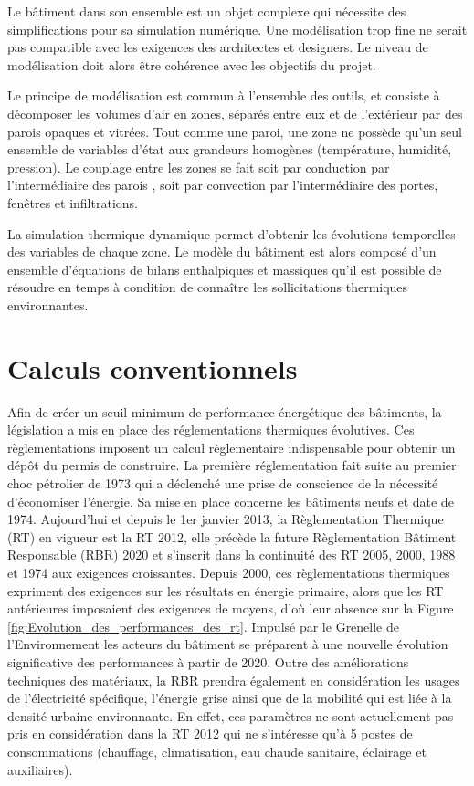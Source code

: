 Le bâtiment dans son ensemble est un objet complexe qui nécessite des simplifications pour sa simulation numérique. Une modélisation trop fine ne serait pas compatible avec les exigences des architectes et designers. Le niveau de modélisation doit alors être cohérence avec les objectifs du projet.

Le principe de modélisation est commun à l'ensemble des outils, et consiste à décomposer les volumes d'air en zones, séparés entre eux et de l'extérieur par des parois opaques et vitrées. Tout comme une paroi, une zone ne possède qu'un seul ensemble de variables d'état aux grandeurs homogènes (température, humidité, pression). Le couplage entre les zones se fait soit par conduction par l'intermédiaire des parois , soit par convection par l'intermédiaire des portes, fenêtres et infiltrations.

La simulation thermique dynamique permet d'obtenir les évolutions temporelles des variables de chaque zone. Le modèle du bâtiment est alors composé d'un ensemble d'équations de bilans enthalpiques et massiques qu'il est possible de résoudre en temps à condition de connaître les sollicitations thermiques environnantes.

\section{Calculs conventionnels}

Afin de créer un seuil minimum de performance énergétique des bâtiments, la législation a mis en place des réglementations thermiques évolutives. Ces règlementations imposent un calcul règlementaire indispensable pour obtenir un dépôt du permis de construire. La première réglementation fait suite au premier choc pétrolier de 1973 qui a déclenché une prise de conscience de la nécessité d'économiser l'énergie. Sa mise en place concerne les bâtiments neufs et date de 1974. Aujourd'hui et depuis le 1er janvier 2013, la Règlementation Thermique (RT) en vigueur est la RT 2012, elle précède la future Règlementation Bâtiment Responsable (RBR) 2020 et s'inscrit dans la continuité des RT 2005, 2000, 1988 et 1974 aux exigences croissantes. Depuis 2000, ces règlementations thermiques expriment des exigences sur les résultats en énergie primaire, alors que les RT antérieures imposaient des exigences de moyens, d'où leur absence sur la Figure \ref{fig:Evolution_des_performances_des_rt}. Impulsé par le Grenelle de l'Environnement les acteurs du bâtiment se préparent à une nouvelle évolution significative des performances à partir de 2020. Outre des améliorations techniques des matériaux, la RBR prendra également en considération les usages de l'électricité spécifique, l'énergie grise ainsi que de la mobilité qui est liée à la densité urbaine environnante. En effet, ces paramètres ne sont actuellement pas pris en considération dans la RT 2012 qui ne s'intéresse qu'à 5 postes de consommations (chauffage, climatisation, eau chaude sanitaire, éclairage et auxiliaires).

